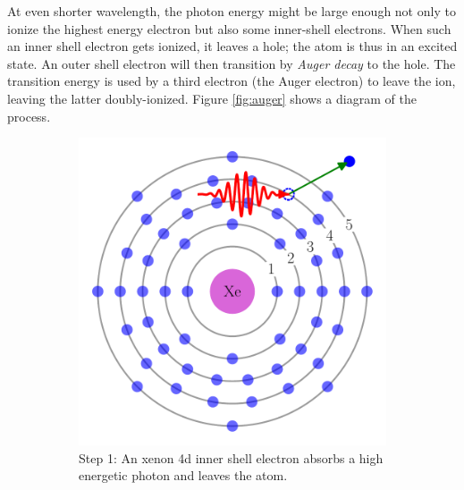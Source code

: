 
{}

At even shorter wavelength, the photon energy might be large enough not only
to ionize the highest energy electron but also some inner-shell electrons.
When such an inner shell electron gets ionized, it leaves a hole; the atom is
thus in an excited state. An outer shell electron will then transition by
\textit{Auger decay} to the hole. The transition energy is used by a third
electron (the Auger electron) to leave the ion, leaving the latter
doubly-ionized. Figure \ref{fig:auger} shows a diagram of the process.

\begin{figure}
 \centering
    \begin{subfigure}{0.48\columnwidth}
        \centering
        \includegraphics[width=\textwidth]{figures/auger_step_1}
        \caption{Step 1: An xenon 4d inner shell electron absorbs a high
                 energetic photon and leaves the atom. \\}
        \label{fig:auger:1}
    \end{subfigure}
    \begin{subfigure}{0.48\columnwidth}

\end{subfigure}
\end{figure}
